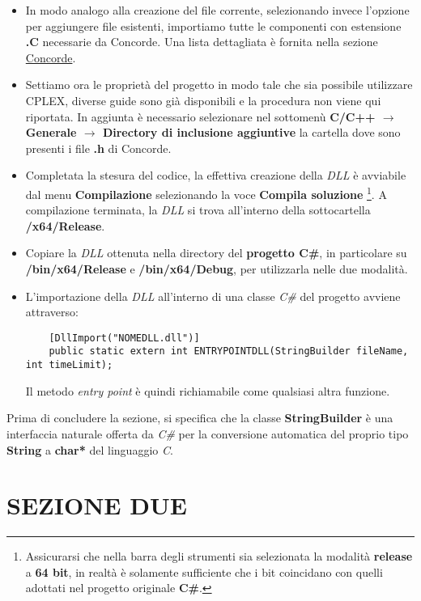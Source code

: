 \documentclass[11pt]{article}
\begin{document}
\begin{itemize}
    \item In modo analogo alla creazione del file corrente, selezionando invece l'opzione per aggiungere file esistenti, importiamo tutte le componenti con estensione \textbf{.C} necessarie da Concorde. Una lista dettagliata è fornita nella sezione \hyperref[sec:ConcordeS]{Concorde}.
    \item Settiamo ora le proprietà del progetto in modo tale che sia possibile utilizzare CPLEX, diverse guide sono già disponibili e la procedura non viene qui riportata. In aggiunta è necessario selezionare nel sottomenù \textbf{C/C++ $\rightarrow$ Generale $\rightarrow$ Directory di inclusione aggiuntive} la cartella dove sono presenti i file \textbf{.h} di Concorde.
    \item Completata la stesura del codice, la effettiva creazione della \textit{DLL} è avviabile dal menu \textbf{Compilazione} selezionando la voce \textbf{Compila soluzione} \footnote{Assicurarsi che nella barra degli strumenti sia selezionata la modalità \textbf{release} a \textbf{64 bit}, in realtà è solamente sufficiente che i bit coincidano con quelli adottati nel progetto originale \textbf{C\#}.}. A compilazione terminata, la \textit{DLL} si trova all'interno della sottocartella \textbf{/x64/Release}.
    \item Copiare la \textit{DLL} ottenuta nella directory del \textbf{progetto C\#}, in particolare su \textbf{/bin/x64/Release} e \textbf{/bin/x64/Debug}, per utilizzarla nelle due modalità.
    \item L'importazione della \textit{DLL} all'interno di una classe \textit{C\#} del progetto avviene attraverso:
    
    \begin{lstlisting}
    [DllImport("NOMEDLL.dll")]
    public static extern int ENTRYPOINTDLL(StringBuilder fileName, int timeLimit);
    \end{lstlisting}
    
    Il metodo \textit{entry point} è quindi richiamabile come qualsiasi altra funzione.
\end{itemize}
    
Prima di concludere la sezione, si specifica che la classe \textbf{StringBuilder} è una interfaccia naturale offerta da \textit{C\#} per la conversione automatica del proprio tipo \textbf{String} a \textbf{char*} del linguaggio \textit{C}.

\newpage

\section*{SEZIONE DUE}
\label{sec:SezioneDueS}
\end{document}
